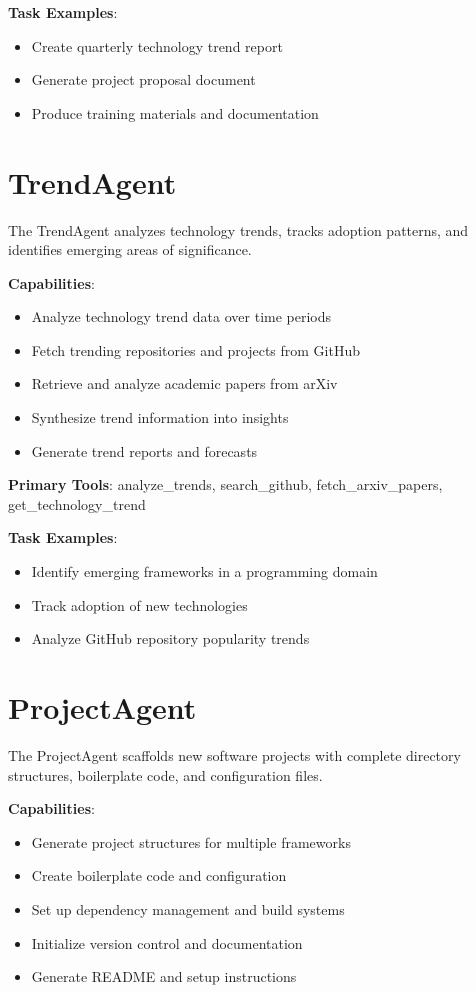 \documentclass{report}
\begin{document}
\textbf{Task Examples}:
\begin{itemize}
    \item Create quarterly technology trend report
    \item Generate project proposal document
    \item Produce training materials and documentation
\end{itemize}

\section{TrendAgent}

The TrendAgent analyzes technology trends, tracks adoption patterns, and identifies emerging areas of significance.

\textbf{Capabilities}:

\begin{itemize}
    \item Analyze technology trend data over time periods
    \item Fetch trending repositories and projects from GitHub
    \item Retrieve and analyze academic papers from arXiv
    \item Synthesize trend information into insights
    \item Generate trend reports and forecasts
\end{itemize}

\textbf{Primary Tools}: analyze\_trends, search\_github, fetch\_arxiv\_papers, get\_technology\_trend

\textbf{Task Examples}:
\begin{itemize}
    \item Identify emerging frameworks in a programming domain
    \item Track adoption of new technologies
    \item Analyze GitHub repository popularity trends
\end{itemize}

\section{ProjectAgent}

The ProjectAgent scaffolds new software projects with complete directory structures, boilerplate code, and configuration files.

\textbf{Capabilities}:

\begin{itemize}
    \item Generate project structures for multiple frameworks
    \item Create boilerplate code and configuration
    \item Set up dependency management and build systems
    \item Initialize version control and documentation
    \item Generate README and setup instructions
\end{itemize}
\end{document}
